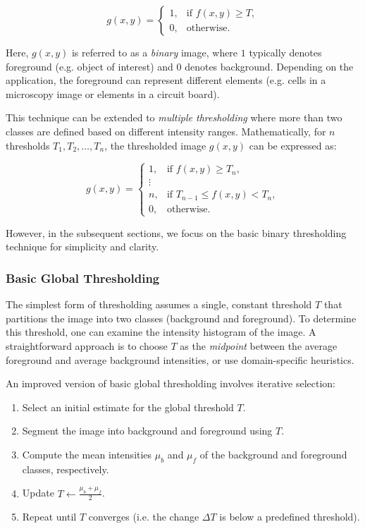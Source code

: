 \documentclass[a4paper,12pt]{article}
\begin{document}
\[
g(x, y) = 
\begin{cases}
1, & \text{if } f(x, y) \geq T, \\
0, & \text{otherwise}.
\end{cases}
\]

Here, \(g(x, y)\) is referred to as a \emph{binary} image, where \(1\) typically denotes foreground (e.g. object of interest) and \(0\) denotes background. Depending on the application, the foreground can represent different elements (e.g. cells in a microscopy image or elements in a circuit board).

This technique can be extended to \emph{multiple thresholding} where more than two classes are defined based on different intensity ranges. Mathematically, for \(n\) thresholds \(T_1, T_2, \ldots, T_n\), the thresholded image \(g(x, y)\) can be expressed as:

\[
g(x, y) =
\begin{cases}
1, & \text{if } f(x, y) \geq T_n, \\
\vdots & \\
n, & \text{if } T_{n-1} \leq f(x, y) < T_n, \\
0, & \text{otherwise}.
\end{cases}
\]

However, in the subsequent sections, we focus on the basic binary thresholding technique for simplicity and clarity.

\subsubsection{Basic Global Thresholding}

The simplest form of thresholding assumes a single, constant threshold \(T\) that partitions the image into two classes (background and foreground). To determine this threshold, one can examine the intensity histogram of the image. A straightforward approach is to choose \(T\) as the \emph{midpoint} between the average foreground and average background intensities, or use domain-specific heuristics.

An improved version of basic global thresholding involves iterative selection:
\begin{enumerate}
    \item Select an initial estimate for the global threshold \(T\).
    \item Segment the image into background and foreground using \(T\).
    \item Compute the mean intensities \(\mu_b\) and \(\mu_f\) of the background and foreground classes, respectively.
    \item Update \(T \leftarrow \frac{\mu_b + \mu_f}{2}\).
    \item Repeat until \(T\) converges (i.e. the change \(\Delta T\) is below a predefined threshold).
\end{enumerate}
\end{document}
